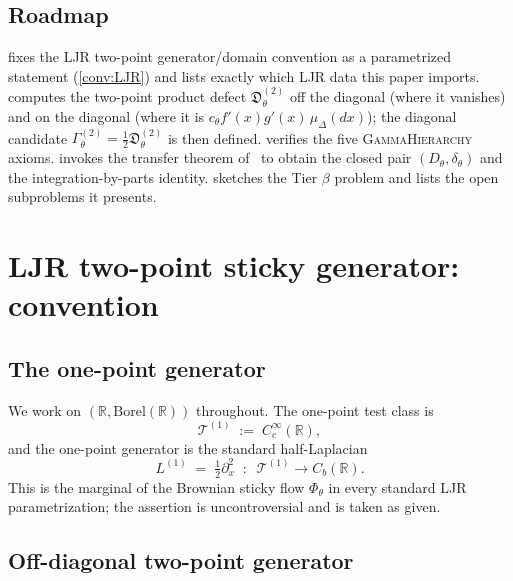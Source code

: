 \documentclass[11pt,reqno]{amsart}
\theoremstyle{plain}
\theoremstyle{definition}
\theoremstyle{remark}
\newcommand{\R}{\mathbb{R}}
\newcommand{\cT}{\mathcal T}
\newcommand{\Dth}{D_{\theta}}
\newcommand{\divth}{\delta_{\theta}}
\begin{document}
\subsection{Roadmap}\label{sec:intro-roadmap}

 fixes the LJR two-point
generator/domain convention as a parametrized statement
(\cref{conv:LJR}) and lists exactly which LJR data this paper
imports.  computes the two-point
product defect $\mathfrak D^{(2)}_{\theta}$ off the diagonal
(where it vanishes) and on the diagonal (where it is
$c_{\theta}f'(x)g'(x)\,\mu_{\Delta}(dx)$); the diagonal
candidate $\Gamma^{(2)}_{\theta}=\frac{1}{2}\mathfrak D^{(2)}_{\theta}$
is then defined.  verifies the five
\textsc{GammaHierarchy} axioms.  invokes the
transfer theorem of~\cite{GammaHierarchyDivergence} to obtain
the closed pair $(\Dth,\divth)$ and the integration-by-parts
identity.  sketches the Tier $\beta$
problem and lists the open subproblems it presents.

\section{LJR two-point sticky generator: convention}\label{sec:LJR-convention}

\subsection{The one-point generator}\label{sec:LJR-onepoint}

We work on $(\R,\mathrm{Borel}(\R))$ throughout. The one-point
test class is
\[
  \cT^{(1)}\;:=\;C_{c}^{\infty}(\R),
\]
and the one-point generator is the standard half-Laplacian
\begin{equation}\label{eq:L1}
  L^{(1)}\;=\;\tfrac{1}{2}\partial_{x}^{2}\;\;\colon\;\;\cT^{(1)}\to C_{b}(\R).
\end{equation}
This is the marginal of the Brownian sticky flow $\Phi_{\theta}$
in every standard LJR parametrization; the assertion is
uncontroversial and is taken as given.

\subsection{Off-diagonal two-point generator}\label{sec:LJR-offdiag}
\end{document}
